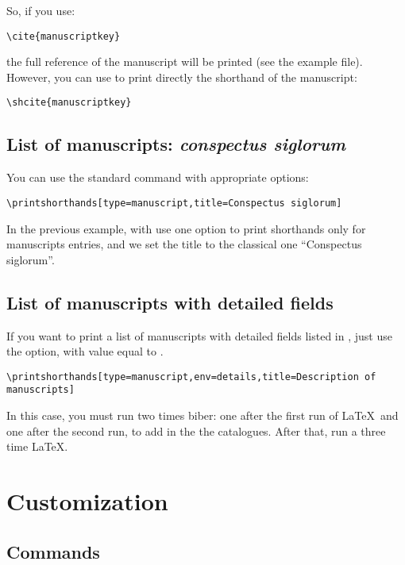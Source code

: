 \documentclass{ltxdockit}[2011/03/25]
\begin{document}
So, if you use:
\begin{verbatim}
\cite{manuscriptkey}
\end{verbatim}

the full reference of the manuscript will be printed (see the example file). However, you can use  to print directly the shorthand of the manuscript:

\begin{verbatim}
\shcite{manuscriptkey}
\end{verbatim}

\subsection{List of manuscripts: \emph{conspectus siglorum}}

You can use the standard command  with appropriate options:

\begin{verbatim}
\printshorthands[type=manuscript,title=Conspectus siglorum]
\end{verbatim}

In the previous example, with use one option to print shorthands only for manuscripts entries, and we set the title to the classical one \enquote{Conspectus siglorum}.

\subsection{List of manuscripts with detailed fields}

If you want to print a list of manuscripts with detailed fields listed in , just use the  option, with value equal to
.

\begin{verbatim}
\printshorthands[type=manuscript,env=details,title=Description of manuscripts]
\end{verbatim}

In this case, you must run two times biber: one after the first run of \LaTeX\ and one after the second run, to add in the  the catalogues. After that, run a three time \LaTeX.

\section{Customization}

\subsection{Commands}
\end{document}
